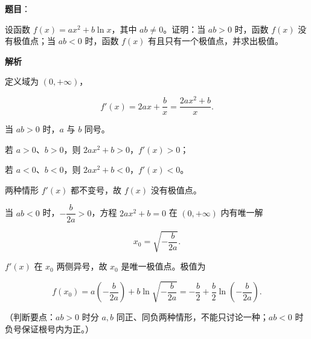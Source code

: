 \begin{answer}

\textbf{题目}：

设函数 $f(x)=ax^2+b\ln x$，其中 $ab\neq0$。证明：当 $ab>0$ 时，函数 $f(x)$ 没有极值点；当 $ab<0$ 时，函数 $f(x)$ 有且只有一个极值点，并求出极值。

\textbf{解析}

定义域为 $(0,+\infty)$，

\nopagebreak[4]
\[f'(x)=2ax+\frac bx=\frac{2ax^2+b}{x}.\]

当 $ab>0$ 时，$a$ 与 $b$ 同号。

若 $a>0$、$b>0$，则 $2ax^2+b>0$，$f'(x)>0$；

若 $a<0$、$b<0$，则 $2ax^2+b<0$，$f'(x)<0$。

两种情形 $f'(x)$ 都不变号，故 $f(x)$ 没有极值点。

当 $ab<0$ 时，$-\dfrac{b}{2a}>0$，方程 $2ax^2+b=0$ 在 $(0,+\infty)$ 内有唯一解

\nopagebreak[4]
\[x_0=\sqrt{-\frac{b}{2a}}.\]

$f'(x)$ 在 $x_0$ 两侧异号，故 $x_0$ 是唯一极值点。极值为

\nopagebreak[4]
\[f(x_0)=a\left(-\frac{b}{2a}\right)+b\ln\sqrt{-\frac{b}{2a}}=-\frac b2+\frac b2\ln\left(-\frac{b}{2a}\right).\]

（判断要点：$ab>0$ 时分 $a,b$ 同正、同负两种情形，不能只讨论一种；$ab<0$ 时负号保证根号内为正。）


\end{answer}
